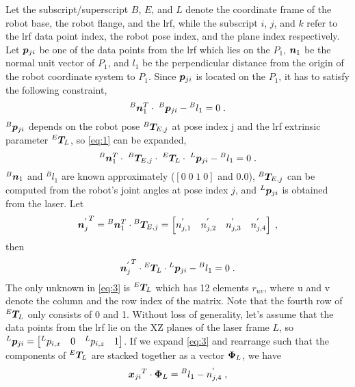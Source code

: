 Let the subscript/superscript $B$, $E$, and $L$ denote the coordinate frame of the robot base, the robot flange, and the \ac{lrf}, while the subscript $i$, $j$, and $k$ refer to the \ac{lrf} data point index, the robot pose index, and the plane index respectively. Let $\vb*{p}_{ji}$ be one of the data points from the \ac{lrf} which lies on the $P_1$, $\vb*{n}_1$ be the normal unit vector of $P_1$, and $l_1$ be the perpendicular distance from the origin of the robot coordinate system to $P_1$.  Since $\vb*{p}_{ji}$ is located on the $P_1$, it has to satisfy the following constraint, 
  \begin{equation}
  \label{eq:1}
  {^B}\vb*{n}_1 ^T \cdot\; {^B}\vb*{p}_{ji}  - {^B}l_1 = 0 \; .
   \end{equation}
${^B}\vb*{p}_{ji}$ depends on the robot pose ${^B}\vb*{T}_{E,j}$ at pose index j and the \ac{lrf} extrinsic parameter ${^E}\vb*{T}_L$, so \eqref{eq:1}  can be expanded,
  \begin{equation}
  {{^B}\vb*{n}_1 ^{T}} \cdot\; {^B}\vb*{T}_{E,j} \cdot \; {^E}\vb*{T}_L \cdot \; {^L}\vb*{p}_{ji}  - {^B}l_1 = 0 \; .
  \end{equation}
${^B}\vb*{n}_1$ and $^{B}l_1$ are known approximately ($[0 \; 0\; 1\;0]$ and $0.0$), ${^B}\vb*{T}_{E,j}$ can be computed from the robot's joint angles at pose index $j$, and ${^L}\vb*{p}_{ji}$ is obtained from the laser. Let 
\begin{equation}
{\vb*{n}_j^{'}}^{T} = {^B}\vb*{n}_1 ^T \cdot {^B}\vb*{T}_{E,j} = 
\left[n^{'}_{j,1} \quad n^{'}_{j,2} \quad n^{'}_{j,3}  \quad n^{'}_{j,4} \right] \; , 
\end{equation}
then  
  \begin{equation}
  \label{eq:3}
  {\vb*{n}_j^{'}} ^T \cdot {^E}\vb*{T}_L \cdot {^L}\vb*{p}_{ji} - {^B}l_1 = 0 \; .
  \end{equation}
The only unknown in \eqref{eq:3} is ${^E}\vb*{T}_L$ which has 12 elements $r_{uv}$, where u and v denote the column and the row index of the matrix. Note that the fourth row of ${^E}\vb*{T}_L$ only consists of 0 and 1. 
Without loss of generality, let's assume that the data points from the \ac{lrf} lie on the XZ planes of the laser frame $L$, so ${^L}\vb*{p}_{ji} = \left[{^L}p_{i,x} \quad 0 \quad {^L}p_{i,z}\quad 1\right]$. If we expand \eqref{eq:3} and rearrange such that the components of ${^E}\vb*{T}_L$ are stacked together as a vector $\vb*{\Phi}_L$, we have
\begin{equation}
\label{eq:4}
  {\vb*{x}_{ji}}^T \cdot \vb*{\Phi}_L = {^B}l_1 -  n^{'}_{j,4} \; , 
\end{equation}
